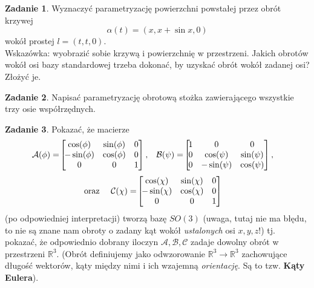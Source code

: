 \documentclass[a4paper,11pt]{article}
\theoremstyle{definition}\newtheorem{exercise}{Zadanie}
\theoremstyle{definition}\newtheorem{remark}{Uwaga}
\begin{document}
\begin{exercise}
Wyznaczyć parametryzację powierzchni powstałej przez obrót krzywej 
\[\alpha(t)=(x,x+\sin{x},0)\] wokół prostej $l=(t,t,0)$.\\[0.1in]
\small{Wskazówka: wyobrazić sobie krzywą i powierzchnię w przestrzeni. Jakich 
obrotów wokół osi bazy standardowej trzeba dokonać, by uzyskać obrót wokół 
zadanej osi? Złożyć je.}
\end{exercise}

\begin{exercise}
 Napisać parametryzację obrotową stożka zawierającego wszystkie trzy osie 
wsp\'ołrzędnych.
\end{exercise}


\begin{exercise}
Pokazać, że macierze 
\begin{align*}
\mathcal{A}(\phi)&=\!\left[\!\!\!\!
\begin{array}{c c c}
\cos(\phi) &	\sin(\phi)&	0\\
-\sin(\phi) &	\cos(\phi)&	0\\
0 &			0 &	1
\end{array}\!\!\!\right], &
\mathcal{B}(\psi)&=\!\left[\!\!\!\!
\begin{array}{c c c}
1 &	0 		&	0\\
0 &	\cos(\psi) 	&	\sin(\psi)\\
0 &	-\sin(\psi) 	&	\cos(\psi)
\end{array}\!\!\!\right],
\end{align*}
\begin{align*}
\text{oraz }\quad\mathcal{C}(\chi)&=\!\left[\!\!\!\!
\begin{array}{c c c}
\cos(\chi) &	\sin(\chi)&	0\\
-\sin(\chi) &	\cos(\chi)&	0\\
0 &			0 &	1
\end{array}\!\!\!\right]
\end{align*}
(po odpowiedniej interpretacji) tworzą bazę $SO(3)$ (uwaga, tutaj nie ma błędu, 
to nie są znane nam obroty o zadany kąt wokół \textit{ustalonych} osi $x,y,z$!) 
tj. pokazać, że odpowiednio dobrany iloczyn $\mathcal{A},\mathcal{B}, 
\mathcal{C}$ zadaje dowolny obrót w przestrzeni $\mathbb{R}^3$.
(Obrót definiujemy jako odwzorowanie $\mathbb{R}^3\to \mathbb{R}^3$ zachowujące 
długość wektorów, kąty między nimi i ich wzajemną \textit{orientację}. Są to 
tzw. \textbf{Kąty Eulera}).
\end{exercise}
\end{document}
